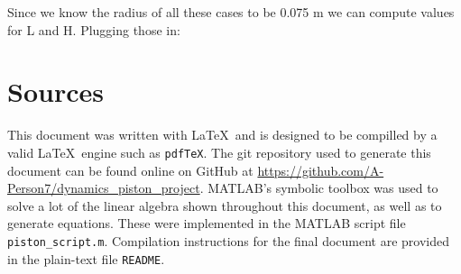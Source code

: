 \documentclass[nofoot,pdf-a,balance,colorlinks,upint,subscriptcorrection,varvw,mathalfa=cal=boondoxo]{asmeconf}
\begin{document}
	Since we know the radius of all these cases to be 0.075 m we can compute values for L and H. Plugging those in:
\begin{table}[H]
        \caption[Table]{Cases to consider (Absolute)}\label{tab:absCases}
    \end{table}


    

    

    \section{Sources}\label{appendix:sources} 

    This document was written with \LaTeX\ and is designed to be compilled by a valid \LaTeX\ engine such as \texttt{pdfTeX}. The git repository used to generate this document can be found online on GitHub at \href{https://github.com/A-Person7/dynamics_piston_project}{https://github.com/A-Person7/dynamics_piston_project}. MATLAB's symbolic toolbox was used to solve a lot of the linear algebra shown throughout this document, as well as to generate equations. These were implemented in the MATLAB script file \texttt{piston_script.m}. Compilation instructions for the final document are provided in the plain-text file \texttt{README}.


    
\end{document}
